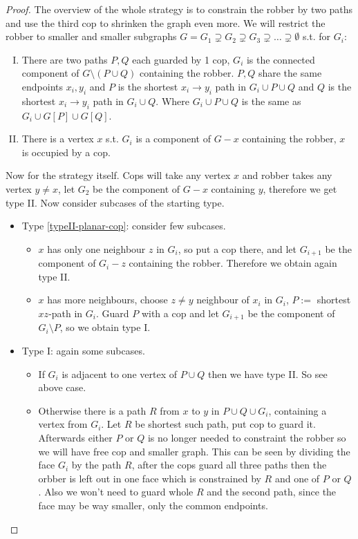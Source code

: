 \begin{proof}
	The overview of the whole strategy is to constrain the robber by two paths and use the third cop to shrinken the graph even more. We will restrict the robber to smaller and smaller subgraphs $G = G_1 \supsetneq G_2 \supsetneq G_3 \supsetneq \dots \supsetneq \emptyset$ s.t. for $G_i$:
	
	\begin{enumerate}[I)]
		\item There are two paths $P,Q$ each guarded by 1 cop, $G_i$ is the connected component of $G \setminus (P \cup Q)$ containing the robber. $P,Q$ share the same endpoints $x_i, y_i$ and $P$ is the shortest $x_i \to y_i$ path in $G_i \cup P \cup Q$ and $Q$ is the shortest $x_i \to y_i$ path in $G_i \cup Q$. Where $G_i \cup P \cup Q$ is the same as $G_i \cup G[P] \cup G[Q]$. \label{typeI-planar-cop}
		\item There is a vertex $x$ s.t. $G_i$ is a component of $G-x$ containing the robber, $x$ is occupied by a cop. \label{typeII-planar-cop}
	\end{enumerate}
	
	Now for the strategy itself. Cops will take any vertex $x$ and robber takes any vertex $y \neq x$, let $G_2$ be the component of $G - x$ containing $y$, therefore we get type II. Now consider subcases of the starting type.
	
	\begin{itemize}[]
		\item Type \ref{typeII-planar-cop}: consider few subcases.
		
		\begin{itemize}
			\item $x$ has only one neighbour $z$ in $G_i$, so put a cop there, and let $G_{i+1}$ be the component of $G_i - z$ containing the robber. Therefore we obtain again type II.
			\item $x$ has more neighbours, choose $z \neq y$ neighbour of $x_i$ in $G_i$, $P :=$ shortest $xz$-path in $G_i$. Guard $P$ with a cop and let $G_{i+1}$ be the component of $G_i \setminus P$, so we obtain type I.
		\end{itemize}
		
		\item Type I: again some subcases.
		
		\begin{itemize}
			\item If $G_i$ is adjacent to one vertex of $P \cup Q$ then we have type II. So see above case.
			\item Otherwise there is a path $R$ from $x$ to $y$ in $P \cup Q \cup G_i$, containing a vertex from $G_i$. Let $R$ be shortest such path, put cop to guard it. Afterwards either $P$ or $Q$ is no longer needed to constraint the robber so we will have free cop and smaller graph. This can be seen by dividing the face $G_i$ by the path $R$, after the cops guard all three paths then the orbber is left out in one face which is constrained by $R$ and one of $P$ or $Q$. Also we won't need to guard whole $R$ and the second path, since the face may be way smaller, only the common endpoints.
		\end{itemize}
	\end{itemize}
\end{proof}